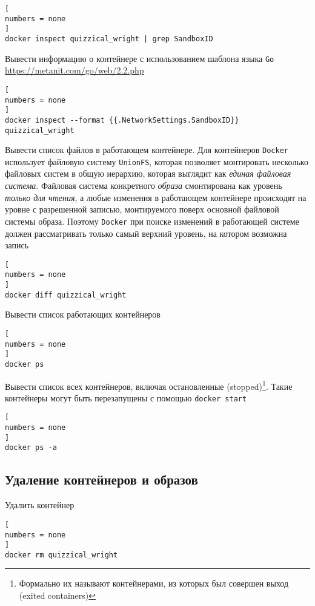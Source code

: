 \documentclass[%
	11pt,
	a4paper,
	utf8,
		]{article}
\begin{document}
\begin{lstlisting}[
numbers = none
]
docker inspect quizzical_wright | grep SandboxID
\end{lstlisting}

Вывести информацию о контейнере с использованием шаблона языка \texttt{Go} \url{https://metanit.com/go/web/2.2.php}

\begin{lstlisting}[
numbers = none
]
docker inspect --format {{.NetworkSettings.SandboxID}} quizzical_wright
\end{lstlisting}

Вывести список файлов в работающем контейнере. Для контейнеров \texttt{Docker} использует файловую систему \texttt{UnionFS}, которая позволяет монтировать несколько файловых систем в общую иерархию, которая выглядит как \emph{единая файловая система}. Файловая система конкретного \emph{образа} смонтирована как уровень \emph{только для чтения}, а любые изменения в работающем контейнере происходят на уровне с разрешенной записью, монтируемого поверх основной {файловой системы образа}. Поэтому \texttt{Docker} при поиске изменений в работающей системе должен рассматривать только самый верхний уровень, на котором возможна запись \cite{mouat:docker-2017}

\begin{lstlisting}[
numbers = none
]
docker diff quizzical_wright
\end{lstlisting}

Вывести список работающих контейнеров

\begin{lstlisting}[
numbers = none
]
docker ps
\end{lstlisting}

Вывести список всех контейнеров, включая остановленные (stopped)\footnote{Формально их называют контейнерами, из которых был совершен выход (exited containers)}. Такие контейнеры могут быть перезапущены с помощью \texttt{docker start}

\begin{lstlisting}[
numbers = none
]
docker ps -a
\end{lstlisting}

\subsection{Удаление контейнеров и образов}

Удалить контейнер 

\begin{lstlisting}[
numbers = none
]
docker rm quizzical_wright
\end{lstlisting}
\end{document}
